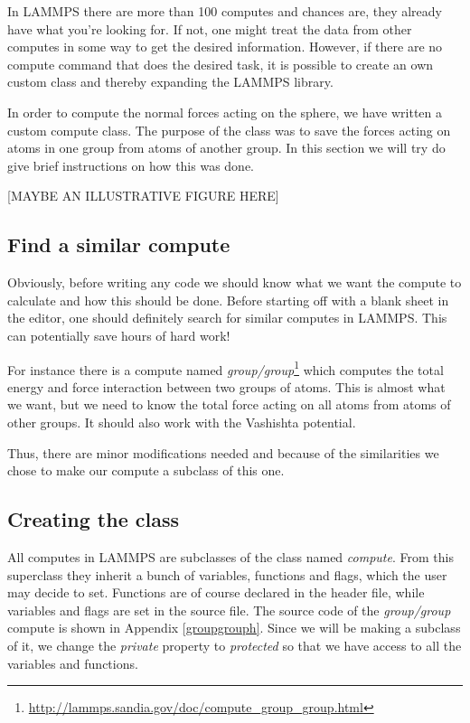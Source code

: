 \documentclass[twoside,english]{uiofysmaster}
\begin{document}
In LAMMPS there are more than 100 computes and chances are, they already have what you're looking for. If not, one might treat the data from other computes in some way to get the desired information. However, if there are no compute command that does the desired task, it is possible to create an own custom class and thereby expanding the LAMMPS library.  

In order to compute the normal forces acting on the sphere, we have written a custom compute class. The purpose of the class was to save the forces acting on atoms in one group from atoms of another group. In this section we will try do give brief instructions on how this was done.

{\color{editColor}[MAYBE AN ILLUSTRATIVE FIGURE HERE]}

\subsection{Find a similar compute}
Obviously, before writing any code we should know what we want the compute to calculate and how this should be done. 
Before starting off with a blank sheet in the editor, one should definitely search for similar computes in LAMMPS. This can potentially save hours of hard work!

For instance there is a compute named \textit{group/group}\footnote{\href{http://lammps.sandia.gov/doc/compute_group_group.html}{http://lammps.sandia.gov/doc/compute\_group\_group.html}} which computes the total energy and force interaction between two groups of atoms. 
This is almost what we want, but we need to know the total force acting on all atoms from atoms of other groups. {\color{editColor}It should also work with the Vashishta potential.}

Thus, there are minor modifications needed and because of the similarities we chose to make our compute a subclass of this one.


\subsection{Creating the class}
All computes in LAMMPS are subclasses of the class named  \textit{compute}. From this superclass they inherit a bunch of variables, functions and flags, which the user may decide to set. Functions are of course declared in the header file, while variables and flags are set in the source file. The source code of the \textit{group/group} compute is shown in Appendix \ref{groupgrouph}. Since we will be making a subclass of it, we change the \textit{private} property to \textit{protected} so that we have access to all the variables and functions.
\end{document}
